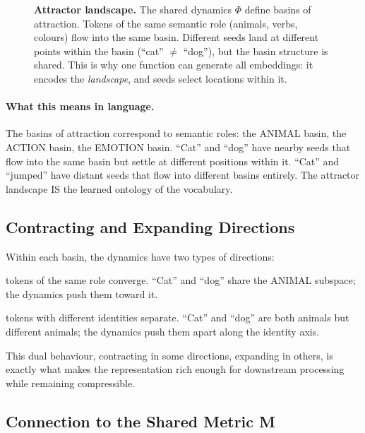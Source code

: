 \documentclass[11pt, a4paper]{article}
\theoremstyle{remark}
\begin{document}
\begin{figure}[h]
\caption{\textbf{Attractor landscape.}
The shared dynamics $\Phi$ define basins of attraction.
Tokens of the same semantic role (animals, verbs, colours) flow into the same basin.
Different seeds land at different points within the basin (``cat'' $\neq$ ``dog''), but the basin structure is shared.
This is why one function can generate all embeddings: it encodes the \emph{landscape}, and seeds select locations within it.}
\label{fig:attractors}
\end{figure}

\paragraph{What this means in language.}
The basins of attraction correspond to semantic roles: the ANIMAL basin, the ACTION basin, the EMOTION basin.
``Cat'' and ``dog'' have nearby seeds that flow into the same basin but settle at different positions within it.
``Cat'' and ``jumped'' have distant seeds that flow into different basins entirely.
The attractor landscape IS the learned ontology of the vocabulary.

\subsection{Contracting and Expanding Directions}

Within each basin, the dynamics have two types of directions:
\begin{description}[nosep]
    \item[Contracting directions:] tokens of the same role converge. ``Cat'' and ``dog'' share the ANIMAL subspace; the dynamics push them toward it.
    \item[Expanding directions:] tokens with different identities separate. ``Cat'' and ``dog'' are both animals but different animals; the dynamics push them apart along the identity axis.
\end{description}
This dual behaviour, contracting in some directions, expanding in others, is exactly what makes the representation rich enough for downstream processing while remaining compressible.

\subsection{Connection to the Shared Metric M}
\end{document}
